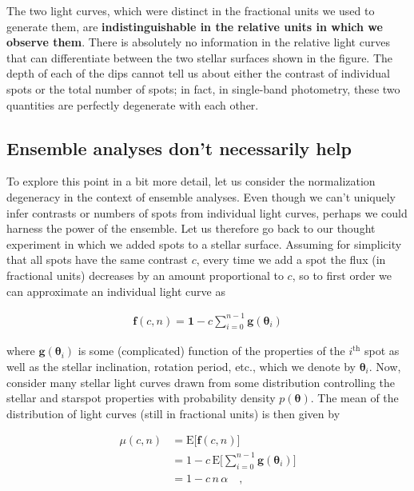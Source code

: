 \documentclass[modern,linenumbers]{aastex62}
\begin{document}
The two light curves, which were distinct in the fractional units we used
to generate them, are \textbf{indistinguishable in the relative units
    in which we observe them}. There is absolutely no information in the
relative light curves that can differentiate between the two stellar
surfaces shown in the figure. The depth of each of the dips cannot tell
us about either the contrast of individual spots or the total number of spots;
in fact, in single-band photometry, these two quantities are perfectly
degenerate with each other.

\subsection{Ensemble analyses don't necessarily help}
\label{sec:basic-gp}
%
To explore this point in a bit more detail, let us consider the normalization
degeneracy in the context of ensemble analyses. Even though we can't
uniquely infer contrasts or numbers of spots from individual light curves,
perhaps we could harness the power of the ensemble.
%
Let us therefore go
back to our thought experiment in which we added spots to a stellar
surface. Assuming for simplicity that all spots have the same contrast $c$,
every time we add a spot the flux (in fractional units)
decreases by an amount proportional to $c$, so to first order we can approximate an
individual light curve as
%
\begin{linenomath}\begin{align}
        \label{eq:fapprox}
        \mathbf{f}(c, n) = \mathbf{1} - c \sum_{i=0}^{n-1} \mathbf{g}(\pmb{\theta}_i)
    \end{align}\end{linenomath}
%
where $\mathbf{g}(\pmb{\theta}_i)$ is some (complicated) function of the properties
of the $i^\mathrm{th}$ spot
as well as the stellar inclination, rotation period, etc., which we
denote by $\pmb{\theta}_i$.
Now, consider many stellar light curves drawn from some distribution
controlling the stellar and starspot properties with probability density
$p(\pmb{\theta})$.
%
The mean of the distribution of
light curves (still in fractional units) is then given by
%
\begin{linenomath}\begin{align}
        \mu(c, n) & = \mathrm{E} \Big[ \mathbf{f} (c, n) \Big] \nonumber                                      \\
                  & = 1 - c \, \mathrm{E} \bigg[ \sum_{i=0}^{n-1} \mathbf{g}(\pmb{\theta}_i) \bigg] \nonumber \\
                  & = 1 - c \, n \, \alpha
        \quad,
    \end{align}\end{linenomath}
\end{document}
